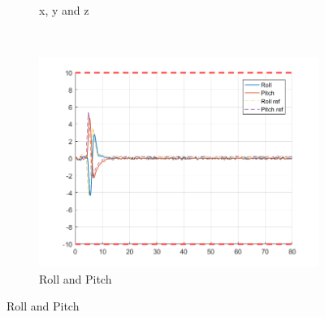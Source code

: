 \documentclass[11pt]{article}
\begin{document}
\begin{enumerate}
\begin{figure}[ht]
\begin{subfigure}[c]{0.3\linewidth}
            \caption{x, y and z}
        \end{subfigure}
        ~
        \begin{subfigure}[c]{0.3\linewidth}
            \centering
            \includegraphics[width=\linewidth]{Plots_11_NonlinearModel_StepSignal/03}
            \caption{Roll and Pitch}
        \end{subfigure}
        

\end{figure}
\end{enumerate}
\end{document}

